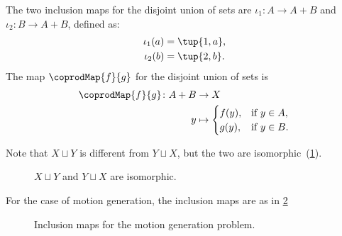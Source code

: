 \begin{example}
The two inclusion maps for the disjoint union of sets are $\iota_1\colon A \to A + B$ and $\iota_2\colon B \to A + B$, defined as:
\begin{equation}
\begin{aligned}
    \iota_1(a) &= \tup{1, a},\\
    \iota_2(b) &= \tup{2, b}.
\end{aligned}
\end{equation}
The map $\coprodMap{f}{g}$ for the disjoint union of sets is
\begin{equation}
\begin{aligned}
    \coprodMap{f}{g} \colon  A + B &\to X \\
    y &   \mapsto
    \begin{cases}
        f(y), & \text{if } y \in A, \\
        g(y), & \text{if } y \in B.
    \end{cases}
\end{aligned}
\end{equation}
\end{example}
Note that $X \sqcup Y$ is different from $Y \sqcup X$, but the two are isomorphic~(\cref{fig:e16}).

\begin{figure}[h!]
    \centering
    \caption{$X \sqcup Y$ and $Y \sqcup X$ are isomorphic. \label{fig:e16}}
\end{figure}
For the case of motion generation, the inclusion maps are as in \cref{fig:inclusiongas}

\begin{figure}[h!]
    \centering
    \caption{Inclusion maps for the motion generation problem. \label{fig:inclusiongas}}
\end{figure}
